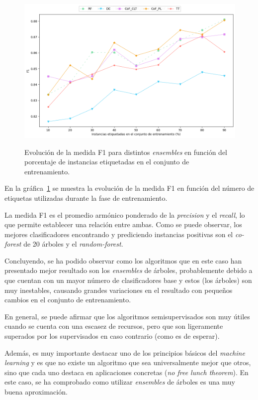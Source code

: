 \begin{figure}[h]
	\caption[\textit{Phishing}: comparativa SL contra SSL (F1~\textit{score})]{Evolución de la medida F1 para distintos \textit{ensembles} en función del porcentaje de instancias etiquetadas en el conjunto de entrenamiento.}
	\centering
	\includegraphics[scale=0.45]{../img/memoria/5_phishing/f1f19_evolution_f1}
	\label{gr:ph-f1f19_sl-ssl-f1}
\end{figure}

En la gráfica~\ref{gr:ph-f1f19_sl-ssl-f1} se muestra la evolución de la medida F1 en función del número de etiquetas utilizadas durante la fase de entrenamiento. 

La medida F1 es el promedio armónico ponderado de la \textit{precision} y el \textit{recall}, lo que permite establecer una relación entre ambas. Como se puede observar, los mejores clasificadores encontrando y prediciendo instancias positivas son el \textit{co-forest} de 20 árboles y el \textit{random-forest}.

Concluyendo, se ha podido observar como los algoritmos que en este caso han presentado mejor resultado son los \textit{ensembles} de árboles, probablemente debido a que cuentan con un mayor número de clasificadores base y estos (los árboles) son muy inestables, causando grandes variaciones en el resultado con pequeños cambios en el conjunto de entrenamiento.

En general, se puede afirmar que los algoritmos semisupervisados son muy útiles cuando se cuenta con una escasez de recursos, pero que son ligeramente superados por los supervisados en caso contrario (como es de esperar). 

Además, es muy importante destacar uno de los principios básicos del \textit{machine learning} y es que no existe un algoritmo que sea universalmente mejor que otros, sino que cada uno destaca en aplicaciones concretas (\textit{no free lunch theorem}). En este caso, se ha comprobado como utilizar \textit{ensembles} de árboles es una muy buena aproximación.

